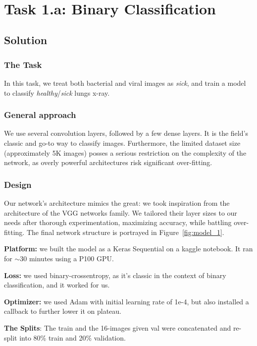 \documentclass{article}
\begin{document}
\
\section{Task 1.a: Binary Classification}

\subsection{Solution}
\subsubsection{The Task}
In this task, we treat both bacterial and viral images as
\textit{sick}, and train a model to classify \textit{healthy}/\textit{sick} lungs x-ray.

\subsubsection{General approach}
We use several convolution layers, followed by a few dense layers. It is the field's classic and go-to way to classify images. Furthermore, the limited dataset size (approximately 5K images) posses a serious restriction on the complexity of the network, as overly powerful architectures risk significant over-fitting.

\subsubsection{Design}

Our network's architecture mimics the great: we took inspiration from the architecture of the VGG networks family. We tailored their layer sizes to our needs after thorough experimentation, maximizing accuracy, while battling over-fitting. The final network structure is portrayed in Figure~\ref{fig:model_1}.

\textbf{Platform:} we built the model as a Keras Sequential on a kaggle notebook. It ran for $\sim$30 minutes using a P100 GPU. 

\textbf{Loss:} we used binary-crossentropy, as it's classic in the context of binary classification, and it worked for us. 

\textbf{Optimizer:} we used Adam with initial learning rate of 1e-4, but also installed a callback to further lower it on plateau.

\textbf{The Splits}: The train and the 16-images given val were concatenated and re-split into 80\% train and 20\% validation.
\end{document}
